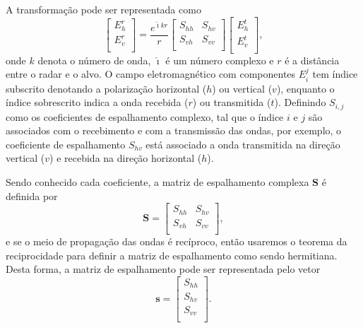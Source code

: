 \documentclass[conference]{IEEEtran}
\begin{document}
A transformação pode ser representada como
\begin{equation*}
 \left[
\begin{array}{c}
	E_{h}^{r}   \\
	E_{v}^{r}    \\
\end{array}
\right]
 = \frac{e^{\hat{\imath} kr}}{r}\left[
\begin{array}{cc}
	S_{hh}   & S_{hv}   \\
	S_{vh}   & S_{vv}   \\
\end{array}
\right]
 \left[
\begin{array}{c}
	E_{h}^{t}   \\
	E_{v}^{t}    \\
\end{array}
\right],
\end{equation*}
onde $k$ denota o número de onda, $\hat{\imath}$ é um número complexo e $r$ é a distância entre o radar e o alvo. O campo eletromagnético com componentes $E_{i}^{j}$ tem índice subscrito denotando a polarização horizontal ($h$) ou vertical ($v$),  enquanto o índice sobrescrito indica a onda recebida ($r$) ou transmitida ($t$). Definindo $S_{i,j}$ como os coeficientes de espalhamento complexo, tal que o índice $i$ e $j$ são associados com o recebimento e com a transmissão das ondas, por exemplo, o coeficiente de espalhamento $S_{hv}$ está associado a onda transmitida na direção vertical ($v$) e recebida na direção horizontal ($h$).

Sendo conhecido cada coeficiente, a matriz de espalhamento complexa $\mathbf{S}$ é definida por
\begin{equation}\label{eq_01}
\mathbf{S} = \left[
\begin{array}{cc}
	S_{hh}   & S_{hv}   \\
	S_{vh}   & S_{vv}   \\
\end{array}
\right],
\end{equation}
e se o meio de propagação das ondas é recíproco, então usaremos o teorema da reciprocidade \cite{lp} para definir a matriz de espalhamento como sendo hermitiana. Desta forma, a matriz de espalhamento pode ser representada pelo vetor
\begin{equation}\label{eq_02}
\mathbf{s} = \left[
\begin{array}{c}
	S_{hh}     \\
    S_{hv}     \\
	S_{vv}     \\
\end{array}
\right].
\end{equation}
\end{document}

